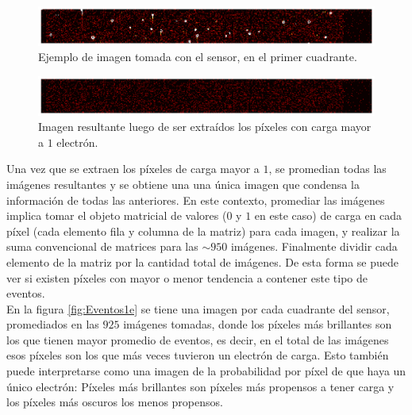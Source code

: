 \begin{figure}[h]
    \centering
    \includegraphics[scale=0.4]{Figs/imagen_fits_original.pdf}
    \caption{\footnotesize{Ejemplo de imagen tomada con el sensor, en el primer cuadrante.}}
    \label{fig:ImagenFitsOriginal}
\end{figure}

\begin{figure}[h]
    \centering
    \includegraphics[scale=0.4]{Figs/imagen_fits_1_e.pdf}
    \caption{\footnotesize{Imagen resultante luego de ser extraídos los píxeles con carga mayor a $1$ electrón.}}
    \label{fig:ImagenFits1e}
\end{figure}
Una vez que se extraen los píxeles de carga mayor a $1$, se promedian todas las imágenes resultantes y se obtiene una una única imagen que condensa la información de todas las anteriores. En este contexto, promediar las imágenes implica tomar el objeto matricial de valores ($0$ y $1$ en este caso) de carga en cada píxel (cada elemento fila y columna de la matriz) para cada imagen, y realizar la suma convencional de matrices para las $\sim 950$ imágenes. Finalmente dividir cada elemento de la matriz por la cantidad total de imágenes. De esta forma se puede ver si existen píxeles con mayor o menor tendencia a contener este tipo de eventos.\\
\indent En la figura \ref{fig:Eventos1e} se tiene una imagen por cada cuadrante del sensor, promediados en las $925$ imágenes tomadas, donde los píxeles más brillantes son los que tienen mayor promedio de eventos, es decir, en el total de las imágenes esos píxeles son los que más veces tuvieron un electrón de carga. Esto también puede interpretarse como una imagen de la probabilidad por píxel de que haya un único electrón: Píxeles más brillantes son píxeles más propensos a tener carga y los píxeles más oscuros los menos propensos.\\
